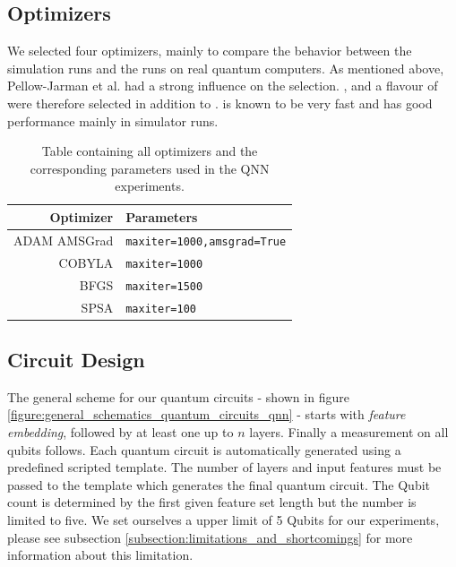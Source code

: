 \subsection{Optimizers}
We selected four optimizers, mainly to compare the behavior between the simulation runs and the runs on real quantum computers. As mentioned above, Pellow-Jarman et al. had a strong influence on the selection. ,  and a flavour of  were therefore selected in addition to .  is known to be very fast and has good performance mainly in simulator runs. 

\begin{table}[!h]
    \centering
    \begin{tabular}{rl}
    \hline
    \textbf{Optimizer}      & \textbf{Parameters}                                      \\ \hline
    ADAM AMSGrad\tablefootnote{\url{https://qiskit.org/documentation/stubs/qiskit.algorithms.optimizers.ADAM.html#qiskit.algorithms.optimizers.ADAM}} & \texttt{maxiter=1000,amsgrad=True}  \\ \hline
    COBYLA\tablefootnote{\url{https://qiskit.org/documentation/stubs/qiskit.algorithms.optimizers.COBYLA.html#qiskit.algorithms.optimizers.COBYLA}} & \texttt{maxiter=1000}               \\ \hline
    BFGS\tablefootnote{\url{https://qiskit.org/documentation/stubs/qiskit.algorithms.optimizers.L_BFGS_B.html#qiskit.algorithms.optimizers.L_BFGS_B}} & \texttt{maxiter=1500}               \\ \hline
    SPSA\tablefootnote{\url{https://qiskit.org/documentation/stubs/qiskit.algorithms.optimizers.SPSA.html#qiskit.algorithms.optimizers.SPSA}} & \texttt{maxiter=100}                \\ \hline
    \end{tabular}
    \caption{Table containing all optimizers and the corresponding parameters used in the QNN experiments.}
    \label{table:qnn_optimizers_and_ parameters}
\end{table}



\clearpage

\subsection{Circuit Design}
The general scheme for our quantum circuits - shown in figure \ref{figure:general_schematics_quantum_circuits_qnn} - starts with \textit{feature embedding}, followed by at least one up to $n$ layers. Finally a measurement on all qubits follows. Each quantum circuit is automatically generated using a predefined scripted template. The number of layers and input features must be passed to the template which generates the final quantum circuit. The Qubit count is determined by the first given feature set length but the number is limited to five. We set ourselves a upper limit of 5 Qubits for our experiments, please see subsection \ref{subsection:limitations_and_shortcomings} for more information about this limitation.

